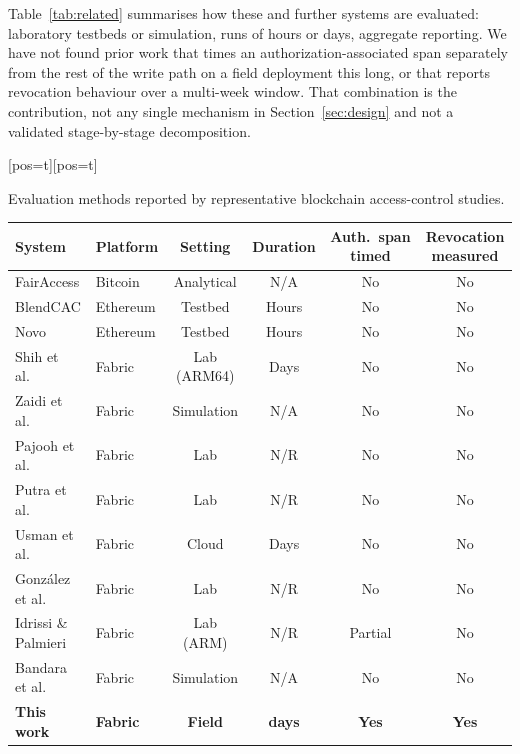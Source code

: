 \documentclass[a4paper,fleqn]{cas-dc}
\makeatletter
\newenvironment{widetab}[1][pos=t]
  {\ifdoublecol \@nameuse{table*}[#1]\else \@nameuse{table}[#1]\fi}
  {\ifdoublecol \@nameuse{endtable*}\else \@nameuse{endtable}\fi}
\makeatother
\begin{document}
Table~\ref{tab:related} summarises how these and further systems
\cite{zaidi2023fabrication,bandara2021modeling} are evaluated: laboratory
testbeds or simulation, runs of hours or days, aggregate reporting. We have
not found prior work that times an authorization-associated span separately
from the rest of the write path on a field deployment this long, or that
reports revocation behaviour over a multi-week window. That combination is
the contribution, not any single mechanism in Section~\ref{sec:design} and
not a validated stage-by-stage decomposition.

\begin{widetab}
\caption{Evaluation methods reported by representative blockchain access-control studies.}
\label{tab:related}
\small
\begin{tabularx}{\linewidth}{@{}l l c c c C@{}}
\toprule
System & Platform & Setting & Duration & Auth.\ span timed & Revocation measured \\
\midrule
FairAccess \cite{ouaddah2016fairaccess}   & Bitcoin  & Analytical & N/A   & No & No \\
BlendCAC \cite{xu2018blendcac}            & Ethereum & Testbed    & Hours & No & No \\
Novo \cite{novo2018blockchain}            & Ethereum & Testbed    & Hours & No & No \\
Shih et al.\ \cite{shih2022iiot}          & Fabric   & Lab (ARM64)& Days  & No & No \\
Zaidi et al.\ \cite{zaidi2023fabrication} & Fabric   & Simulation & N/A   & No & No \\
Pajooh et al.\ \cite{pajooh2022fabric_iot}& Fabric   & Lab        & N/R   & No & No \\
Putra et al.\ \cite{putra2021trust}       & Fabric   & Lab        & N/R   & No & No \\
Usman et al.\ \cite{usman2024blockchain}  & Fabric   & Cloud      & Days  & No & No \\
Gonz\'{a}lez et al.\ \cite{gonzalez2023marketplace} & Fabric & Lab & N/R & No & No \\
Idrissi \& Palmieri \cite{idrissi2024blockchain_jsupercomput}
                                          & Fabric   & Lab (ARM)  & N/R   & Partial & No \\
Bandara et al.\ \cite{bandara2021modeling}& Fabric   & Simulation & N/A   & No & No \\
\textbf{This work}                        & \textbf{Fabric} &
  \textbf{Field} & \textbf{\DeployDays{} days} & \textbf{Yes} & \textbf{Yes} \\
\bottomrule
\end{tabularx}
\end{widetab}
\end{document}
